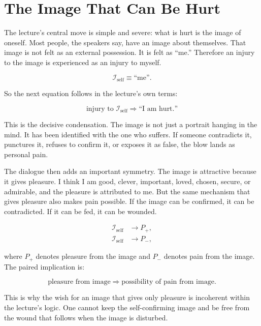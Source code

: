 \section{The Image That Can Be Hurt}

The lecture's central move is simple and severe: what is hurt is the image of oneself. Most people, the speakers say, have an image about themselves. That image is not felt as an external possession. It is felt as ``me.'' Therefore an injury to the image is experienced as an injury to myself.

\begin{equation}
\mathcal{I}_{\text{self}} \equiv \text{``me''}.
\end{equation}

So the next equation follows in the lecture's own terms:

\begin{equation}
\text{injury to }\mathcal{I}_{\text{self}}
\Rightarrow
\text{``I am hurt.''}
\end{equation}

This is the decisive condensation. The image is not just a portrait hanging in the mind. It has been identified with the one who suffers. If someone contradicts it, punctures it, refuses to confirm it, or exposes it as false, the blow lands as personal pain.

The dialogue then adds an important symmetry. The image is attractive because it gives pleasure. I think I am good, clever, important, loved, chosen, secure, or admirable, and the pleasure is attributed to me. But the same mechanism that gives pleasure also makes pain possible. If the image can be confirmed, it can be contradicted. If it can be fed, it can be wounded.

\begin{align}
\mathcal{I}_{\text{self}} &\to P_{+}, \\
\mathcal{I}_{\text{self}} &\to P_{-},
\end{align}

where \(P_{+}\) denotes pleasure from the image and \(P_{-}\) denotes pain from the image. The paired implication is:

\begin{equation}
\text{pleasure from image}
\Rightarrow
\text{possibility of pain from image}.
\end{equation}

This is why the wish for an image that gives only pleasure is incoherent within the lecture's logic. One cannot keep the self-confirming image and be free from the wound that follows when the image is disturbed.

